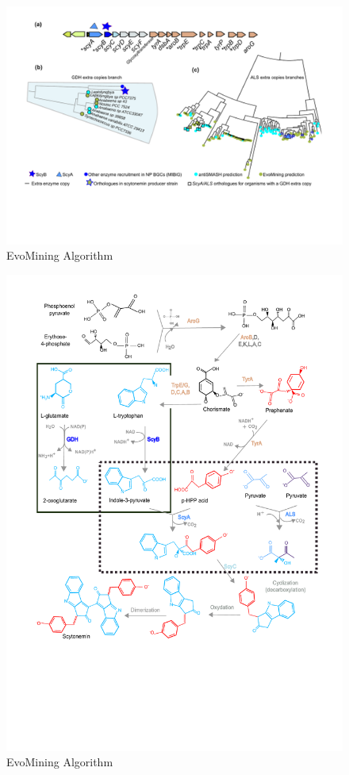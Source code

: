 \documentclass[12pt,twoside]{reedthesis}
\begin{document}
  \begin{figure}[h!tbp]
  \centering
  \includegraphics[angle = 0,scale = 1]{chapter2/FigurasPaper/Figure5.pdf}
  \caption[EvoMining Algorithm]{\normalsize{EvoMining Algorithm}}
  \label{fig:EvoMining Algorithms}
  \end{figure}
  
  \begin{figure}[h!tbp]
  \centering
  \includegraphics[angle = 0,scale = 1]{chapter2/FigurasPaper/Figure6.pdf}
  \caption[EvoMining Algorithm]{\normalsize{EvoMining Algorithm}}
  \label{fig:EvoMining Algorithms}
  \end{figure}
  
\end{document}
